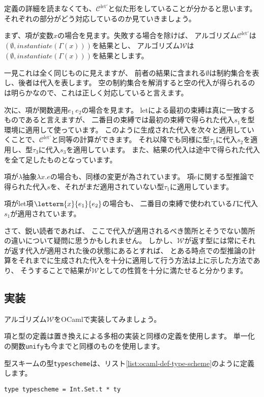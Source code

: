 定義の詳細を読まなくても、$\mathcal C^\mathrm{let'}$と似た形をしていることが分かると思います。
それぞれの部分がどう対応しているのか見ていきましょう。

まず、項が変数$x$の場合を見ます。失敗する場合を除けば、
アルゴリズム$\mathcal C^\mathrm{let'}$は$(\emptyset,\mathit{instantiate}(\Gamma(x)))$を結果とし、
アルゴリズム$\mathcal W$は$(\emptyset, \mathit{instantiate}(\Gamma(x)))$を結果とします。

一見これは全く同じものに見えますが、
前者の結果に含まれる$\emptyset$は制約集合を表し、後者は代入を表します。
空の制約集合を解消すると空の代入が得られるのは明らかなので、これは正しく対応していると言えます。

次に、項が関数適用$e_1 \, e_2$の場合を見ます。
letによる最初の束縛は真に一致するものであると言えますが、
二番目の束縛では最初の束縛で得られた代入$s_1$を型環境に適用して使っています。
このように生成された代入を次々と適用していくことで、$\mathcal C^\mathrm{let'}$と同等の計算ができます。
それ以降でも同様に型$\tau_1$に代入$s_2$を適用し、型$\tau_3$に代入$s_3$を適用しています。
また、結果の代入は途中で得られた代入を全て足したものとなっています。

項が$\lambda$抽象$\lambda x. e$の場合も、同様の変更が為されています。
項$e$に関する型推論で得られた代入$s$を、それがまだ適用されていない型$\tau_1$に適用しています。

項がlet項$\letterm{x}{e_1}{e_2}$の場合も、
二番目の束縛で使われている$\Gamma$に代入$s_1$が適用されています。

さて、鋭い読者であれば、
ここで代入が適用されるべき箇所とそうでない箇所の違いについて疑問に思うかもしれません。
しかし、$\mathcal W$が返す型には常にそれが返す代入が適用された後の状態にあるとすれば、
とある時点での型推論の計算をそれまでに生成された代入を十分に適用して行う方法は上に示した方法であり、
そうすることで結果が$\mathcal W$としての性質を十分に満たせると分かります。

\subsection{実装}

アルゴリズム$\mathcal W$をOCamlで実装してみましょう。

項と型の定義は置き換えによる多相の実装と同様の定義を使用します。
単一化の関数\texttt{unify}も今までと同様のものを使用します。

型スキームの型\texttt{typescheme}は、リスト\ref{list:ocaml-def-type-scheme}のように定義します。

\begin{lstlisting}[caption=型スキームの定義, label=list:ocaml-def-type-scheme]
type typescheme = Int.Set.t * ty
\end{lstlisting}


